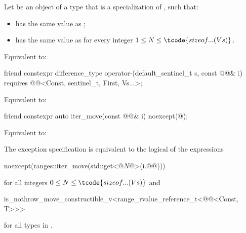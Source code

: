 \begin{itemdescr}
\pnum
Let  be an object of a type
that is a specialization of , such that:
\begin{itemize}
\item
{} has the same value as
;
\item
{} has the same value as
for every integer $1 \le N \le \tcode{sizeof...(Vs)}$.
\end{itemize}

\pnum
\effects
Equivalent to: 
\end{itemdescr}

%
\begin{itemdecl}
friend constexpr difference_type operator-(default_sentinel_t s, const @@& i)
  requires @@<Const, sentinel_t, First, Vs...>;
\end{itemdecl}

\begin{itemdescr}
\pnum
\effects
Equivalent to: 
\end{itemdescr}

%
\begin{itemdecl}
friend constexpr auto iter_move(const @@& i) noexcept(@\seebelow@);
\end{itemdecl}

\begin{itemdescr}
\pnum
\effects
Equivalent to: 

\pnum
\remarks
The exception specification is equivalent to
the logical  of the expressions
\begin{codeblock}
noexcept(ranges::iter_move(std::get<@$N$@>(i.@@)))
\end{codeblock}
for all integers $0 \le N \le \tcode{sizeof...(Vs)}$ and
\begin{codeblock}
is_nothrow_move_constructible_v<range_rvalue_reference_t<@@<Const, T>>>
\end{codeblock}
for all types  in .
\end{itemdescr}


